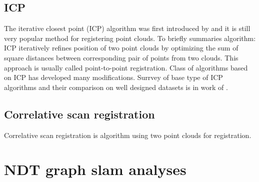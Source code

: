 \subsection {ICP}
\label{subsec:ICP}
The iterative closest point (\gls{ICP}) algorithm was first introduced by \cite{chen92ICP} and it is still very popular method for registering point clouds. To briefly summaries algorithm: ICP iteratively refines position of two point clouds by optimizing the sum of square distances between corresponding pair of points from two clouds. This approach is usually called point-to-point registration. Class of algorithms based on \gls{ICP} has developed many modifications. Surrvey of base type of ICP algorithms and their comparison on well designed datasets is in work of \cite{pomerleau2013comparing}. 


\newpage
\subsection{Correlative scan registration}
\label{subsec:Corr}
Correlative scan registration is algorithm using two point clouds for registration.
\newpage
\section{NDT graph slam analyses}
\label{subsec:analyses}

